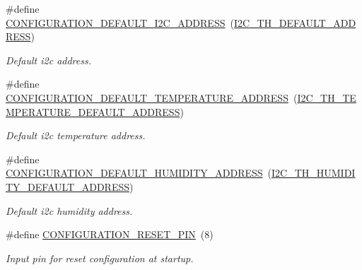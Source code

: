 \begin{DoxyCompactItemize}
\#define \hyperlink{i2c-th-config_8h_a25fb304ef264a84353f1d4cfc61128e9}{C\+O\+N\+F\+I\+G\+U\+R\+A\+T\+I\+O\+N\+\_\+\+D\+E\+F\+A\+U\+L\+T\+\_\+\+I2\+C\+\_\+\+A\+D\+D\+R\+E\+SS}~(\hyperlink{registers-th_8h_a66906eb81e92beab5f2076ac49996132}{I2\+C\+\_\+\+T\+H\+\_\+\+D\+E\+F\+A\+U\+L\+T\+\_\+\+A\+D\+D\+R\+E\+SS})
\begin{DoxyCompactList}\small\item\em Default i2c address. \end{DoxyCompactList}\item 
\mbox{\label{i2c-th-config_8h_afd732a8bd16aa3939928851656adb365}} 
\#define \hyperlink{i2c-th-config_8h_afd732a8bd16aa3939928851656adb365}{C\+O\+N\+F\+I\+G\+U\+R\+A\+T\+I\+O\+N\+\_\+\+D\+E\+F\+A\+U\+L\+T\+\_\+\+T\+E\+M\+P\+E\+R\+A\+T\+U\+R\+E\+\_\+\+A\+D\+D\+R\+E\+SS}~(\hyperlink{registers-th_8h_a6d2d1a9b4ae7894be4b062205255f1ff}{I2\+C\+\_\+\+T\+H\+\_\+\+T\+E\+M\+P\+E\+R\+A\+T\+U\+R\+E\+\_\+\+D\+E\+F\+A\+U\+L\+T\+\_\+\+A\+D\+D\+R\+E\+SS})
\begin{DoxyCompactList}\small\item\em Default i2c temperature address. \end{DoxyCompactList}\item 
\mbox{\label{i2c-th-config_8h_a6d8fda545e952788d1692c9395b2ff2d}} 
\#define \hyperlink{i2c-th-config_8h_a6d8fda545e952788d1692c9395b2ff2d}{C\+O\+N\+F\+I\+G\+U\+R\+A\+T\+I\+O\+N\+\_\+\+D\+E\+F\+A\+U\+L\+T\+\_\+\+H\+U\+M\+I\+D\+I\+T\+Y\+\_\+\+A\+D\+D\+R\+E\+SS}~(\hyperlink{registers-th_8h_aa7b1a0982e4333dd39c7829eda6baa42}{I2\+C\+\_\+\+T\+H\+\_\+\+H\+U\+M\+I\+D\+I\+T\+Y\+\_\+\+D\+E\+F\+A\+U\+L\+T\+\_\+\+A\+D\+D\+R\+E\+SS})
\begin{DoxyCompactList}\small\item\em Default i2c humidity address. \end{DoxyCompactList}\item 
\mbox{\label{i2c-th-config_8h_ae90da4786d4ba14563681879dba4d39c}} 
\#define \hyperlink{i2c-th-config_8h_ae90da4786d4ba14563681879dba4d39c}{C\+O\+N\+F\+I\+G\+U\+R\+A\+T\+I\+O\+N\+\_\+\+R\+E\+S\+E\+T\+\_\+\+P\+IN}~(8)
\begin{DoxyCompactList}\small\item\em Input pin for reset configuration at startup. \end{DoxyCompactList}\item 

\end{DoxyCompactItemize}
